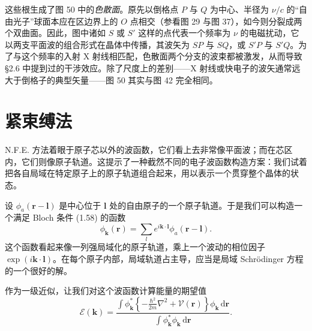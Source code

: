 
这些根生成了图 50 中的\emph{色散面}。原先以倒格点 $P$ 与 $Q$ 为中心、半径为 $\nu/c$ 的“自由光子”球面本应在区边界上的 $O$ 点相交（参看图 29 与图 37），如今则分裂成两个双曲面。因此，图中诸如 $S$ 或 $S'$ 这样的点代表一个频率为 $\nu$ 的电磁扰动，它以两支平面波的组合形式在晶体中传播，其波矢为 $SP$ 与 $SQ$，或 $S'P$ 与 $S'Q$。为了与这个频率的入射 X 射线相匹配，色散面两个分支的波束都被激发，从而导致 §2.6 中提到过的干涉效应。除了尺度上的差别——X 射线或快电子的波矢通常远大于倒格子的典型矢量——图 50 其实与图 42 完全相同。

\section{紧束缚法}

N.F.E. 方法着眼于原子芯以外的波函数，它们看上去非常像平面波；而在芯区内，它们则像原子轨道。这提示了一种截然不同的电子波函数构造方案：我们试着把各自局域在特定原子上的原子轨道组合起来，用以表示一个贯穿整个晶体的状态。

设 $\phi_a(\mathbf{r}-\mathbf{l})$ 是中心位于 $\mathbf{l}$ 处的自由原子的一个原子轨道。于是我们可以构造一个满足 Bloch 条件 (1.58) 的函数
\begin{equation*}
\phi_{\mathbf{k}}(\mathbf{r})=\sum_{l}e^{i\mathbf{k}\cdot\mathbf{l}}\phi_a(\mathbf{r}-\mathbf{l}).
\tag{3.24}
\end{equation*}
这个函数看起来像一列强局域化的原子轨道，乘上一个波动的相位因子 $\exp(i\mathbf{k}\cdot\mathbf{l})$。在每个原子内部，局域轨道占主导，应当是局域 Schr\"odinger 方程的一个很好的解。

作为一级近似，让我们对这个波函数计算能量的期望值
\begin{equation*}
\mathcal{E}(\mathbf{k})=\frac{\displaystyle\int\phi_{\mathbf{k}}^{*}\left\{-\frac{\hbar^{2}}{2m}\nabla^{2}+\mathcal{V}(\mathbf{r})\right\}\phi_{\mathbf{k}}\,\mathrm{d}\mathbf{r}}{\displaystyle\int\phi_{\mathbf{k}}^{*}\phi_{\mathbf{k}}\,\mathrm{d}\mathbf{r}}.
\tag{3.25}
\end{equation*}


